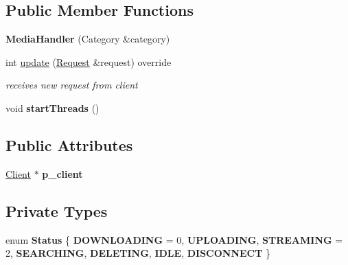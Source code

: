 \subsection*{Public Member Functions}
\begin{DoxyCompactItemize}
\item 
\mbox{\label{classMediaHandler_ad244cb53ebdabf58f2c54d5cb418f0cb}} 
{\bfseries Media\+Handler} (Category \&category)
\item 
int \hyperlink{classMediaHandler_ae0c5fa9c02ac287d2e04699d67a02eaf}{update} (\hyperlink{classRequest}{Request} \&request) override
\begin{DoxyCompactList}\small\item\em receives new request from client \end{DoxyCompactList}\item 
\mbox{\label{classMediaHandler_a2cb06c3f6c1bd1af74ab4692723c89f6}} 
void {\bfseries start\+Threads} ()
\end{DoxyCompactItemize}
\subsection*{Public Attributes}
\begin{DoxyCompactItemize}
\item 
\mbox{\label{classMediaHandler_aba19c2fd2e904d928ce5914f9dbf8f38}} 
\hyperlink{classClient}{Client} $\ast$ {\bfseries p\+\_\+client}
\end{DoxyCompactItemize}
\subsection*{Private Types}
\begin{DoxyCompactItemize}
\item 
\mbox{\label{classMediaHandler_a37ef6d69a0f149af8df7166f43882721}} 
enum {\bfseries Status} \{ \newline
{\bfseries D\+O\+W\+N\+L\+O\+A\+D\+I\+NG} = 0, 
{\bfseries U\+P\+L\+O\+A\+D\+I\+NG}, 
{\bfseries S\+T\+R\+E\+A\+M\+I\+NG} = 2, 
{\bfseries S\+E\+A\+R\+C\+H\+I\+NG}, 
\newline
{\bfseries D\+E\+L\+E\+T\+I\+NG}, 
{\bfseries I\+D\+LE}, 
{\bfseries D\+I\+S\+C\+O\+N\+N\+E\+CT}
 \}
\end{DoxyCompactItemize}
